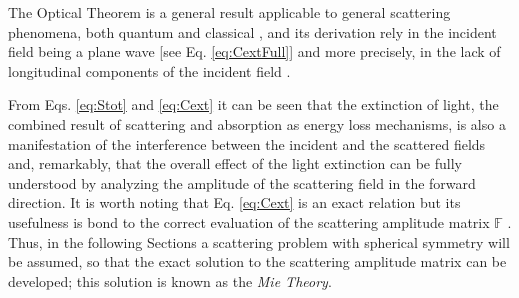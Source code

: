 %
%
%
\noindent The Optical Theorem is a general result applicable to general scattering phenomena, both quantum and classical  \cite{bohren_absorption_1983,newton_optical_1976}, and its derivation rely in the incident field being a plane wave [see Eq. \eqref{eq:CextFull}] and more precisely, in the lack of longitudinal components of the incident field \cite{krasavin_generalization_2018,born_max_principle_1999}.

From Eqs. \eqref{eq:Stot} and  \eqref{eq:Cext} it can be seen that the extinction of light, the combined result of scattering and absorption as energy loss mechanisms, is also a manifestation of the interference between the incident and the scattered fields and, remarkably,  that the overall effect of the light extinction can be fully understood by analyzing the  amplitude of the scattering field in the forward direction.  It is worth noting that Eq. \eqref{eq:Cext} is an exact relation but its usefulness is bond to the correct evaluation of the scattering amplitude matrix $\mathbb{F}$ \cite{tsang_scattering_2000}. Thus, in the following Sections a scattering problem with spherical symmetry will be assumed, so that the exact solution to the scattering amplitude matrix can be developed; this solution is known as the \emph{Mie Theory}.
